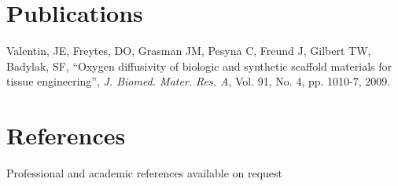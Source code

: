 \documentclass[margin,line]{resume}
\begin{document}
\begin{resume}
    \section{\mysidestyle Publications}

    Valentin, JE, Freytes, DO, Grasman JM, Pesyna C, Freund J, Gilbert TW,
    Badylak, SF,
    ``Oxygen diffusivity of biologic and synthetic scaffold materials for tissue engineering'',
    \textsl{J. Biomed. Mater. Res. A}, Vol. 91, No. 4, pp. 1010-7, 2009.

    \section{\mysidestyle References} 
    {Professional and academic references available on request}

\end{resume}
\end{document}
